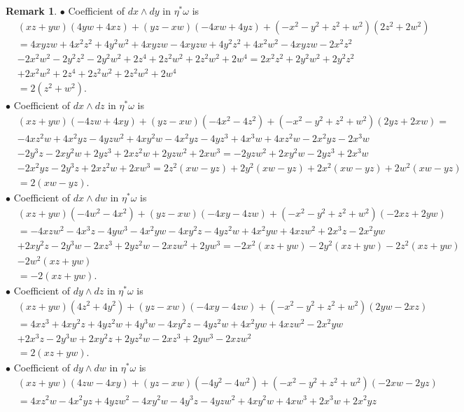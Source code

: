 \documentclass{article}
\theoremstyle{plain}
\theoremstyle{definition}
\newtheorem{rem}[thm]{Remark}
\begin{document}
\begin{appendices}
\begin{rem}
$\bullet$ Coefficient of $dx \wedge dy$ in $\eta^\ast\omega$ is
\begin{align*}
& (xz+yw)(4yw+4xz) + (yz-xw)(-4xw+4yz) + (-x^2-y^2+z^2+w^2)(2z^2+2w^2) \\
& = 4xyzw+4x^2z^2+4y^2w^2+4xyzw-4xyzw+4y^2z^2+4x^2w^2-4xyzw-2x^2z^2 \\
& -2x^2w^2-2y^2z^2-2y^2w^2+2z^4+2z^2w^2+2z^2w^2+2w^4 = 2x^2z^2+2y^2w^2+2y^2z^2 \\
& +2x^2w^2+2z^4+2z^2w^2+2z^2w^2+2w^4 \\
& = 2(z^2+w^2).
\end{align*}
$\bullet$ Coefficient of $dx \wedge dz$ in $\eta^\ast\omega$ is
\begin{align*}
& (xz+yw)(-4zw+4xy) + (yz-xw)(-4x^2-4z^2) + (-x^2-y^2+z^2+w^2)(2yz+2xw) = \\
& -4xz^2w+4x^2yz-4yzw^2+4xy^2w-4x^2yz-4yz^3+4x^3w+4xz^2w-2x^2yz-2x^3w \\
& -2y^3z-2xy^2w+2yz^3+2xz^2w+2yzw^2+2xw^3 = -2yzw^2+2xy^2w-2yz^3+2x^3w \\
& -2x^2yz-2y^3z+2xz^2w+2xw^3 = 2z^2(xw-yz)+2y^2(xw-yz)+2x^2(xw-yz)+2w^2(xw-yz) \\
& = 2(xw-yz).
\end{align*}
$\bullet$ Coefficient of $dx \wedge dw$ in $\eta^\ast\omega$ is
\begin{align*}
& (xz+yw)(-4w^2-4x^2)+(yz-xw)(-4xy-4zw) + (-x^2-y^2+z^2+w^2)(-2xz+2yw) \\
& = -4xzw^2-4x^3z-4yw^3-4x^2yw-4xy^2z-4yz^2w+4x^2yw+4xzw^2+2x^3z-2x^2yw \\
& +2xy^2z-2y^3w-2xz^3+2yz^2w-2xzw^2+2yw^3 = -2x^2(xz+yw) - 2y^2(xz+yw) - 2z^2(xz+yw) \\
& -2w^2(xz+yw) \\
& = -2(xz+yw).
\end{align*}
$\bullet$ Coefficient of $dy \wedge dz$ in $\eta^\ast\omega$ is
\begin{align*}
& (xz+yw)(4z^2+4y^2) + (yz-xw)(-4xy-4zw) + (-x^2-y^2+z^2+w^2)(2yw-2xz) \\
& = 4xz^3+4xy^2z+4yz^2w+4y^3w-4xy^2z-4yz^2w+4x^2yw+4xzw^2-2x^2yw \\
& +2x^3z-2y^3w+2xy^2z+2yz^2w-2xz^3+2yw^3-2xzw^2 \\
& = 2(xz+yw).
\end{align*}
$\bullet$ Coefficient of $dy \wedge dw$ in $\eta^\ast\omega$ is
\begin{align*}
& (xz+yw)(4zw-4xy)+(yz-xw)(-4y^2-4w^2)+(-x^2-y^2+z^2+w^2)(-2xw-2yz) \\
& = 4xz^2w-4x^2yz+4yzw^2-4xy^2w-4y^3z-4yzw^2+4xy^2w+4xw^3+2x^3w+2x^2yz \\

\end{align*}
\end{rem}
\end{appendices}
\end{document}
